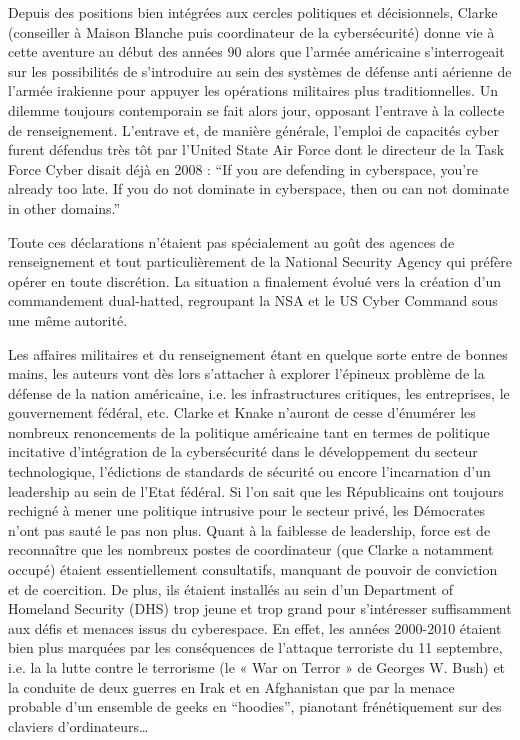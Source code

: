 Depuis des positions bien intégrées aux cercles politiques et décisionnels, Clarke (conseiller à Maison Blanche puis coordinateur de la cybersécurité) donne vie à cette aventure au début des années 90 alors que l’armée américaine s’interrogeait sur les possibilités de s’introduire au sein des systèmes de défense anti aérienne de l’armée irakienne pour appuyer les opérations militaires plus traditionnelles. Un dilemme toujours contemporain se fait alors jour, opposant l’entrave à la collecte de renseignement. L’entrave et, de manière générale, l’emploi de capacités cyber furent défendus très tôt par l’United State Air Force dont le directeur de la Task Force Cyber disait déjà en 2008 : “If you are defending in cyberspace, you’re already too late. If you do not dominate in cyberspace, then ou can not dominate in other domains.”

Toute ces déclarations n’étaient pas spécialement au goût des agences de renseignement et tout particulièrement de la National Security Agency qui préfère opérer en toute discrétion. La situation a finalement évolué vers la création d’un commandement dual-hatted, regroupant la NSA et le US Cyber Command sous une même autorité.

Les affaires militaires et du renseignement étant en quelque sorte entre de bonnes mains, les auteurs vont dès lors s’attacher à explorer l’épineux problème de la défense de la nation américaine, i.e. les infrastructures critiques, les entreprises, le gouvernement fédéral, etc. Clarke et Knake n’auront de cesse d’énumérer les nombreux renoncements de la politique américaine tant en termes de politique incitative d’intégration de la cybersécurité dans le développement du secteur technologique, l’édictions de standards de sécurité ou encore l’incarnation d’un leadership au sein de l’Etat fédéral. Si l’on sait que les Républicains ont toujours rechigné à mener une politique intrusive pour le secteur privé, les Démocrates n’ont pas sauté le pas non plus. Quant à la faiblesse de leadership, force est de reconnaître que les nombreux postes de coordinateur (que Clarke a notamment occupé) étaient essentiellement consultatifs, manquant de pouvoir de conviction et de coercition. De plus, ils étaient installés au sein d’un Department of Homeland Security (DHS) trop jeune et trop grand pour s’intéresser suffisamment aux défis et menaces issus du cyberespace. En effet, les années 2000-2010 étaient bien plus marquées par les conséquences de l’attaque terroriste du 11 septembre, i.e. la la lutte contre le terrorisme (le « War on Terror » de Georges W. Bush) et la conduite de deux guerres en Irak et en Afghanistan que par la menace probable d’un ensemble de geeks en “hoodies”, pianotant frénétiquement sur des claviers d’ordinateurs…

